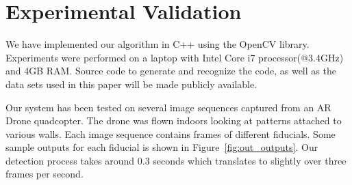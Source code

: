 \documentclass[10pt,twocolumn,letterpaper]{article}
\begin{document}

\section{Experimental Validation}

We have implemented our algorithm in C++ using the OpenCV library.
Experiments were performed on a laptop with Intel Core i7
processor(@3.4GHz) and 4GB RAM.  Source code to generate and recognize
the code, as well as the data sets used in this paper will be made
publicly available.

Our system has been tested on several image sequences captured from an
AR Drone quadcopter.  The drone was flown indoors looking at patterns
attached to various walls. Each image sequence contains frames of
different fiducials. Some sample outputs for each fiducial
is shown in Figure~\ref{fig:out_outputs}. Our detection process takes
around 0.3 seconds which translates to slightly over three frames per
second.
\end{document}
